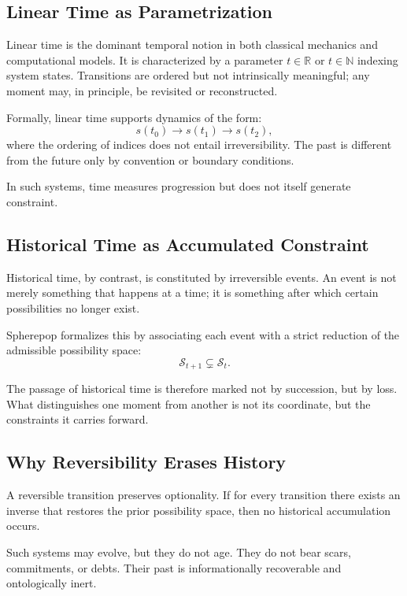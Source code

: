 \documentclass[11pt]{article}
\begin{document}
\subsection{Linear Time as Parametrization}

Linear time is the dominant temporal notion in both classical mechanics and computational models. It is characterized by a parameter $t \in \mathbb{R}$ or $t \in \mathbb{N}$ indexing system states. Transitions are ordered but not intrinsically meaningful; any moment may, in principle, be revisited or reconstructed.

Formally, linear time supports dynamics of the form:
\[
s(t_0) \xrightarrow{} s(t_1) \xrightarrow{} s(t_2),
\]
where the ordering of indices does not entail irreversibility. The past is different from the future only by convention or boundary conditions.

In such systems, time measures progression but does not itself generate constraint.

\subsection{Historical Time as Accumulated Constraint}

Historical time, by contrast, is constituted by irreversible events. An event is not merely something that happens at a time; it is something after which certain possibilities no longer exist.

Spherepop formalizes this by associating each event with a strict reduction of the admissible possibility space:
\[
\mathcal{S}_{t+1} \subsetneq \mathcal{S}_t.
\]

The passage of historical time is therefore marked not by succession, but by loss. What distinguishes one moment from another is not its coordinate, but the constraints it carries forward.

\subsection{Why Reversibility Erases History}

A reversible transition preserves optionality. If for every transition there exists an inverse that restores the prior possibility space, then no historical accumulation occurs.

Such systems may evolve, but they do not age. They do not bear scars, commitments, or debts. Their past is informationally recoverable and ontologically inert.
\end{document}
